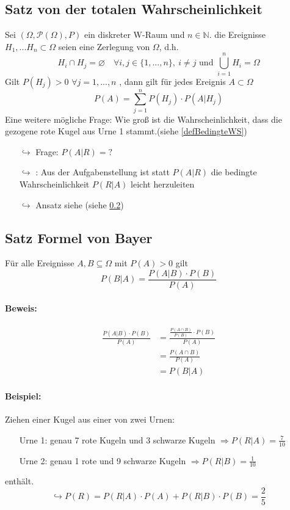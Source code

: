 \documentclass[12pt,a4paper]{article}
\begin{document}
 	\subsection{Satz von der totalen Wahrscheinlichkeit}
 	Sei $(\Omega,\mathcal{P}(\Omega),P)$ ein diskreter W-Raum und $n\in\mathbb{N}$. die Ereignisse $H_1,...H_n \subset\Omega$ seien eine Zerlegung von $\Omega$, d.h. 
 	$$H_i \cap H_j = \varnothing \quad \forall i,j\in\{1,...,n\},\: i\neq j \text{ und } \bigcup_{i=1}^n H_i =\Omega$$
 	Gilt $P(H_j)>0$  $\forall j=1,...,n$ , dann gilt für jedes Ereignis $A\subset\Omega$
 	$$P(A)=\sum_{j=1}^n P(H_j)\cdot P(A|H_j)$$
 	Eine weitere mögliche Frage: Wie groß ist die Wahrscheinlichkeit, dass die gezogene rote Kugel aus Urne 1 stammt.(siehe \ref{defBedingteWS})
 	\begin{itemize}
 	\item[$\hookrightarrow$] Frage: $P(A|R)=?$
 	\item[$\hookrightarrow$] : Aus der Aufgabenstellung ist statt $P(A|R)$ die bedingte Wahrscheinlichkeit $P(R|A)$ leicht herzuleiten 
 	\item[$\hookrightarrow$] Ansatz siehe (siehe  \ref{satzBayer})	
 	\end{itemize}
 	
 	\subsection{Satz Formel von Bayer}
 	\label{satzBayer}
 	Für alle Ereignisse $A,B\subseteq\Omega$ mit $P(A)>0$ gilt
 	$$P(B|A)=\frac{P(A|B)\cdot P(B)}{P(A)}$$
 	\paragraph{Beweis:}
 	\begin{equation*}
 	\begin{split}
	\frac{P(A|B)\cdot P(B)}{P(A)} & =\frac{\frac{P(A\cap B)}{P(B)}\cdot P(B)}{P(A)}\\
	& =\frac{P(A\cap B)}{P(A)}\\
	& =P(B|A) 	
 	\end{split}
 	\end{equation*}
 	
 	\paragraph{Beispiel:}
 	Ziehen einer Kugel aus einer von zwei Urnen:
 	\begin{itemize}
 		\item[] Urne 1: genau 7 rote Kugeln und 3 schwarze Kugeln $\Rightarrow P(R|A)=\frac{7}{10}$
 		\item[] Urne 2: genau 1 rote und 9 schwarze Kugeln $\Rightarrow P(R|B)=\frac{1}{10}$
  	\end{itemize}
 	enthält.
 	$$\hookrightarrow P(R)=P(R|A)\cdot P(A) + P(R|B)\cdot P(B)=\frac{2}{5}$$
\end{document}
